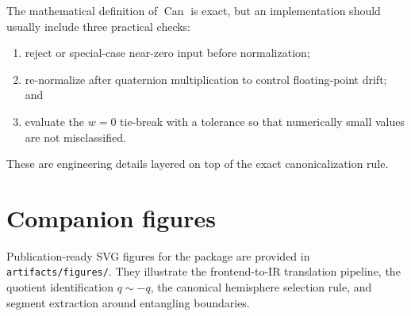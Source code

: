 \documentclass[11pt]{article}
\theoremstyle{remark}
\newcommand{\canon}{\operatorname{Can}}
\begin{document}
The mathematical definition of $\canon$ is exact, but an implementation should
usually include three practical checks:
\begin{enumerate}[label=(\alph*), leftmargin=1.5em]
\item reject or special-case near-zero input before normalization;
\item re-normalize after quaternion multiplication to control floating-point
drift; and
\item evaluate the $w=0$ tie-break with a tolerance so that numerically small
values are not misclassified.
\end{enumerate}

These are engineering details layered on top of the exact canonicalization rule.

\section{Companion figures}

Publication-ready SVG figures for the package are provided in
\texttt{artifacts/figures/}. They illustrate the frontend-to-IR translation
pipeline, the quotient identification $q\sim -q$, the canonical hemisphere
selection rule, and segment extraction around entangling boundaries.



\end{document}
